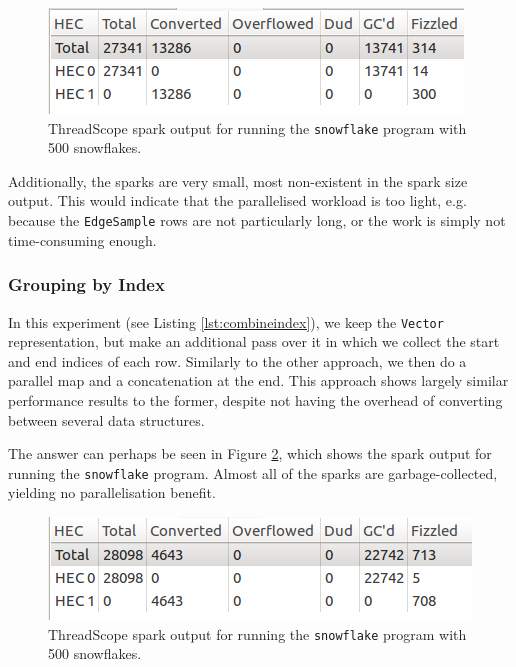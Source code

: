\documentclass[12pt, a4paper]{article}
\begin{document}
 \begin{figure}[H]
  \centering
  \includegraphics[scale=1]{../threadscope/combinegrouped/sparks}
  \caption{ThreadScope spark output for running the \texttt{snowflake} program with 500 snowflakes.}
  \label{fig:combinegrouped-sparks}
\end{figure}

Additionally, the sparks are very small, most non-existent in the spark size output. This would indicate that the parallelised workload is too light, e.g. because the \texttt{EdgeSample} rows are not particularly long, or the work is simply not time-consuming enough.

\subsubsection{Grouping by Index}

In this experiment (see Listing \ref{lst:combineindex}), we keep the \texttt{Vector} representation, but make an additional pass over it in which we collect the start and end indices of each row. Similarly to the other approach, we then do a parallel map and a concatenation at the end. This approach shows largely similar performance results to the former, despite not having the overhead of converting between several data structures.

The answer can perhaps be seen in Figure \ref{fig:combineindex-sparks}, which shows the spark output for running the \texttt{snowflake} program. Almost all of the sparks are garbage-collected, yielding no parallelisation benefit.

 \begin{figure}[h!]
  \centering
  \includegraphics[scale=1]{../threadscope/combineindex/sparks}
  \caption{ThreadScope spark output for running the \texttt{snowflake} program with 500 snowflakes.}
  \label{fig:combineindex-sparks}
\end{figure}
\end{document}
